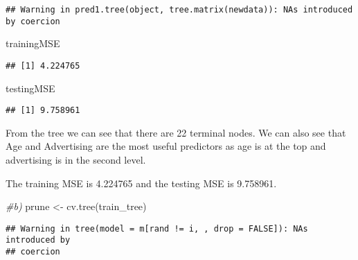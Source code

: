 \documentclass[
]{article}
\newenvironment{Shaded}{\begin{snugshade}}{\end{snugshade}}
\newcommand{\AttributeTok}[1]{\textcolor[rgb]{0.77,0.63,0.00}{#1}}
\newcommand{\CommentTok}[1]{\textcolor[rgb]{0.56,0.35,0.01}{\textit{#1}}}
\newcommand{\DecValTok}[1]{\textcolor[rgb]{0.00,0.00,0.81}{#1}}
\newcommand{\FunctionTok}[1]{\textcolor[rgb]{0.00,0.00,0.00}{#1}}
\newcommand{\NormalTok}[1]{#1}
\newcommand{\OtherTok}[1]{\textcolor[rgb]{0.56,0.35,0.01}{#1}}
\newcommand{\SpecialCharTok}[1]{\textcolor[rgb]{0.00,0.00,0.00}{#1}}
\begin{document}
\begin{Shaded}
\end{Shaded}

\begin{verbatim}
## Warning in pred1.tree(object, tree.matrix(newdata)): NAs introduced by coercion
\end{verbatim}

\begin{Shaded}
\begin{Highlighting}[]
\NormalTok{trainingMSE}
\end{Highlighting}
\end{Shaded}

\begin{verbatim}
## [1] 4.224765
\end{verbatim}

\begin{Shaded}
\begin{Highlighting}[]
\NormalTok{testingMSE}
\end{Highlighting}
\end{Shaded}

\begin{verbatim}
## [1] 9.758961
\end{verbatim}

From the tree we can see that there are 22 terminal nodes. We can also
see that Age and Advertising are the most useful predictors as age is at
the top and advertising is in the second level.

The training MSE is 4.224765 and the testing MSE is 9.758961.

\begin{Shaded}
\begin{Highlighting}[]
\CommentTok{\#b)}
\NormalTok{prune }\OtherTok{\textless{}{-}} \FunctionTok{cv.tree}\NormalTok{(train\_tree)}
\end{Highlighting}
\end{Shaded}

\begin{verbatim}
## Warning in tree(model = m[rand != i, , drop = FALSE]): NAs introduced by
## coercion
\end{verbatim}
\end{document}
